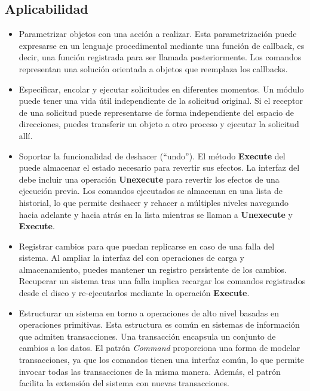 \subsection*{Aplicabilidad}

\begin{itemize}
\item Parametrizar objetos con una acción a realizar. Esta parametrización puede expresarse en un lenguaje procedimental mediante una función de \gls{callback}, es decir, una función registrada para ser llamada posteriormente. Los comandos representan una solución orientada a objetos que reemplaza los \glspl{callback}.


\item Especificar, encolar y ejecutar solicitudes en diferentes momentos. Un módulo \Command puede tener una vida útil independiente de la solicitud original. Si el receptor de una solicitud puede representarse de forma independiente del espacio de direcciones, puedes transferir un objeto \Command a otro proceso y ejecutar la solicitud allí.

\item Soportar la funcionalidad de deshacer (``undo''). El método \textbf{Execute} del \Command puede almacenar el estado necesario para revertir sus efectos. La interfaz del \Command debe incluir una operación \textbf{Unexecute} para revertir los efectos de una ejecución previa. Los comandos ejecutados se almacenan en una lista de historial, lo que permite deshacer y rehacer a múltiples niveles navegando hacia adelante y hacia atrás en la lista mientras se llaman a \textbf{Unexecute} y \textbf{Execute}.

\item Registrar cambios para que puedan replicarse en caso de una falla del sistema. Al ampliar la interfaz del \Command con operaciones de carga y almacenamiento, puedes mantener un registro persistente de los cambios. Recuperar un sistema tras una falla implica recargar los comandos registrados desde el disco y re-ejecutarlos mediante la operación \textbf{Execute}.

\item Estructurar un sistema en torno a operaciones de alto nivel basadas en operaciones primitivas. Esta estructura es común en sistemas de información que admiten transacciones. Una transacción encapsula un conjunto de cambios a los datos. El patrón \textit{Command} proporciona una forma de modelar transacciones, ya que los comandos tienen una interfaz común, lo que permite invocar todas las transacciones de la misma manera. Además, el patrón facilita la extensión del sistema con nuevas transacciones.
\end{itemize}


